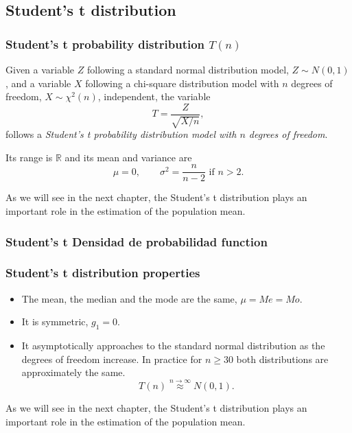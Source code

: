 \subsection{Student's t distribution}

\begin{frame}
\frametitle{Student's t probability distribution $T(n)$}

\begin{definition}
Given a variable $Z$ following a standard normal distribution model, $Z\sim N(0,1)$, and a variable $X$ following a
chi-square distribution model with $n$ degrees of freedom, $X\sim \chi^2(n)$,  independent, the variable 
\[
T = \frac{Z}{\sqrt{X/n}},
\]
follows a \emph{Student's t probability distribution model with $n$ degrees of freedom}.
\end{definition}

Its range is $\mathbb{R}$ and its mean and variance are
\[
\mu = 0, \qquad \sigma^2 = \frac{n}{n-2} \mbox{ if $n>2$}.
\]

As we will see in the next chapter, the Student's t distribution plays an important role in the estimation of the population mean.
\end{frame}


\begin{frame}
\frametitle{Student's t Densidad de probabilidad function}

\begin{center}
\end{center}
\end{frame}


\begin{frame}
\frametitle{Student's t distribution properties}
\begin{itemize}
\item The mean, the median and the mode are the same, $\mu=Me=Mo$.
\item It is symmetric, $g_1=0$.
\item It asymptotically approaches to the standard normal distribution as the degrees of freedom increase. 
In practice for $n\geq 30$ both distributions are approximately the same. 
\[
T(n)\stackrel{n\rightarrow \infty}{\approx}N(0,1).
\]
\end{itemize}
As we will see in the next chapter, the Student’s t distribution plays an important role in the estimation of the population mean.
\end{frame}


